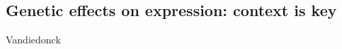 \begin{outline}
%
%


\section{Genetic effects on expression: context is key}


    Vandiedonck


\end{outline}
